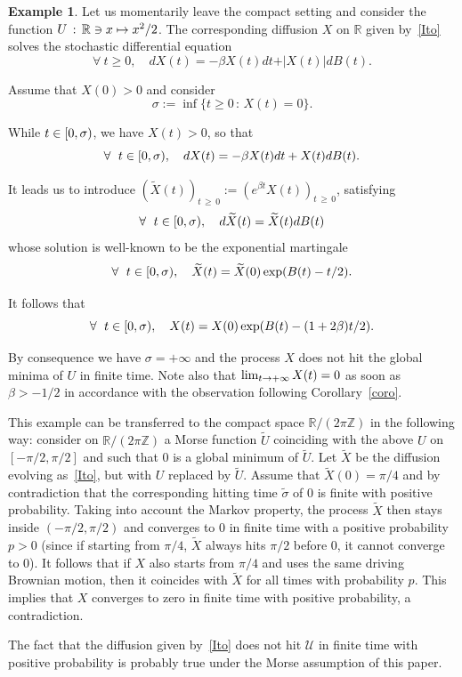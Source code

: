 \documentclass[10pt]{amsart}
\theoremstyle{definition}\newtheorem{defi}[theo]{Definition}\newtheorem{rema}[theo]{Remark}\newtheorem{exam}[theo]{Example}\newtheorem{exem}[theo]{Example}\newtheorem{nota}[theo]{Notation}
\newcommand{\cU}{\mathcal{U}}
\newcommand{\RR}{\mathbb{R}}
\newcommand{\ZZ}{\mathbb{Z}}
\newcommand{\iy}{\infty}
\newcommand{\wi}{\widetilde}
\newcommand{\fo}{\forall\ }
\let\oldin\in
\renewcommand{\in}{\mathchoice{\oldin}{\oldin}{\,\oldin\,}{\,\oldin\,}}
\renewcommand*{\to}{\mathchoice{\longrightarrow}{\rightarrow}{\rightarrow}{\rightarrow}}
\let\oldmapsto\mapsto
\renewcommand*{\mapsto}{\mathchoice{\longmapsto}{\oldmapsto}{\oldmapsto}{\oldmapsto}}
\let\oldforall\forall
\renewcommand*{\forall}{\mathrel{\oldforall}}
\begin{document}
\begin{exam}\label{cari}
Let us momentarily leave the compact setting and consider the function $U\,:\, \RR\ni x\mapsto x^2/2$. The corresponding diffusion $X$ on $\RR$ given by~\eqref{Ito} solves the stochastic differential equation
\begin{equation*}
\fo t\geq 0,\quad dX(t) = -\beta X(t)dt +\vert X(t)\vert dB(t).
\end{equation*}

Assume that $X(0)>0$ and consider
\begin{equation*}
\sigma := \inf\{t\geq 0\,:\, X(t)=0\}.
\end{equation*}

While $t\in[0,\sigma)$, we have $X(t)> 0$, so that
\begin{equation*}
\fo t\in[0,\sigma),\quad dX(t) = -\beta X(t)dt + X(t)dB(t).
\end{equation*}


It leads us to introduce $(\wi X(t))_{t\,\geq\,0}:=(e^{\beta t}X(t))_{t\,\geq\,0}$, satisfying
\begin{equation*}
\fo t\in[0,\sigma),\quad d\wi X(t) = \wi X(t)dB(t)\end{equation*}
whose solution is well-known to be the exponential martingale
\begin{equation*}
\fo t\in[0,\sigma),\quad \wi X(t) = \wi X(0)\exp(B(t)-t/2).
\end{equation*}

It follows that
\begin{equation*}
\fo t\in[0,\sigma),\quad X(t) = X(0)\exp(B(t)-(1+2\beta)t/2).
\end{equation*}

By consequence we have $\sigma=+\iy$ and the process $X$ does not hit the global minima of $U$ in finite time. Note also that $\lim_{t\to +\iy} X(t)=0$ as soon as $\beta>-1/2$ in accordance with the observation following Corollary~\ref{coro}.


This example can be transferred to the compact space $\RR/(2\pi\ZZ)$ in the following way: consider on $\RR/(2\pi\ZZ)$ a Morse function $\wi U$ coinciding with the above $U$ on $[-\pi/2,\pi/2]$ and such that 0 is a global minimum of $\wi U$. Let $\wi X$ be the diffusion evolving as~\eqref{Ito}, but with $U$ replaced by $\wi U$. Assume that $\wi X(0)=\pi/4$ and by contradiction that the corresponding hitting time $\wi\sigma$ of 0 is finite with positive probability. Taking into account the Markov property, the process $\wi X$ then stays inside $(-\pi/2,\pi/2)$ and converges to 0 in finite time with a positive probability $p>0$ (since if starting from $\pi/4$, $\wi X$ always hits $\pi/2$ before 0, it cannot converge to 0). It follows that if $X$ also starts from $\pi/4$ and uses the same driving Brownian motion, then it coincides with $\wi X$ for all times with probability $p$. This implies that $X$ converges to zero in finite time with positive probability, a contradiction.


The fact that the diffusion given by~\eqref{Ito} does not hit $\cU$ in finite time with positive probability is probably true under the Morse assumption of this paper.
\end{exam}
\end{document}
